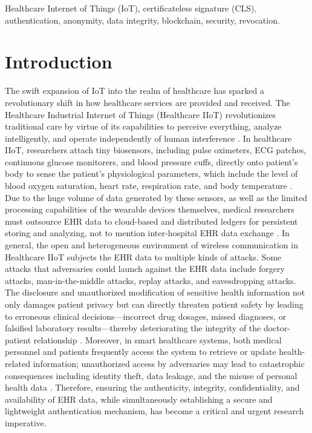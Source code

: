 \documentclass[conference]{IEEEtran}
\begin{document}
\begin{IEEEkeywords}
Healthcare Internet of Things (IoT), certificateless signature (CLS),
authentication, anonymity, data integrity, blockchain, security, revocation.
\end{IEEEkeywords}

\section{Introduction}

The swift expansion of IoT into the realm of healthcare has sparked a revolutionary shift in how healthcare services are provided and received. The Healthcare Industrial Internet of Things (Healthcare IIoT) revolutionizes traditional care by virtue of its capabilities to perceive everything, analyze intelligently, and operate independently of human interference \cite{ref1,ref2}. In healthcare IIoT, researchers attach tiny biosensors, including pulse oximeters, ECG patches, continuous glucose monitorers, and blood pressure cuffs, directly onto patient's body to sense the patient's physiological parameters, which include the level of blood oxygen saturation, heart rate, respiration rate, and body temperature \cite{ref3}. Due to the huge volume of data generated by these sensors, as well as the limited processing capabilities of the wearable devices themselves, medical researchers must outsource EHR data to cloud-based and distributed ledgers for persistent storing and analyzing, not to mention inter-hospital EHR data exchange \cite{ref4,ref5}.
In general, the open and heterogeneous environment of wireless communication in Healthcare IIoT subjects the EHR data to multiple kinds of attacks. Some attacks that adversaries could launch against the EHR data include forgery attacks, man-in-the-middle attacks, replay attacks, and eavesdropping attacks\cite{ref6}. The disclosure and unauthorized modification of sensitive health information not only damages patient privacy but can directly threaten patient safety by leading to erroneous clinical decisions---incorrect drug dosages, missed diagnoses, or falsified laboratory results---thereby deteriorating the integrity of the doctor-patient relationship \cite{ref7}. Moreover, in smart healthcare systems, both medical personnel and patients frequently access the system to retrieve or update health-related information; unauthorized access by adversaries may lead to catastrophic consequences including identity theft, data leakage\cite{ref8}, and the misuse of personal health data . Therefore, ensuring the authenticity, integrity, confidentiality, and availability of EHR data, while simultaneously establishing a secure and lightweight authentication mechanism, has become a critical and urgent research imperative.
\end{document}
